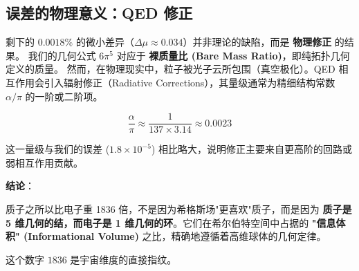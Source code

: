 \subsection{误差的物理意义：QED 修正}

剩下的 $0.0018\%$ 的微小差异（$\Delta \mu \approx 0.034$）并非理论的缺陷，而是 \textbf{物理修正} 的结果。
我们的几何公式 $6\pi^5$ 对应于 \textbf{裸质量比 (Bare Mass Ratio)}，即纯拓扑几何定义的质量。
然而，在物理现实中，粒子被光子云所包围（真空极化）。QED 相互作用会引入辐射修正（Radiative Corrections），其量级通常为精细结构常数 $\alpha / \pi$ 的一阶或二阶项。

\[\frac{\alpha}{\pi} \approx \frac{1}{137 \times 3.14} \approx 0.0023\]

这一量级与我们的误差 ($1.8 \times 10^{-5}$) 相比略大，说明修正主要来自更高阶的回路或弱相互作用贡献。

\textbf{结论}：

质子之所以比电子重 1836 倍，不是因为希格斯场"更喜欢"质子，而是因为 \textbf{质子是 5 维几何的结，而电子是 1 维几何的环}。它们在希尔伯特空间中占据的 \textbf{"信息体积" (Informational Volume)} 之比，精确地遵循着高维球体的几何定律。

这个数字 $1836$ 是宇宙维度的直接指纹。

